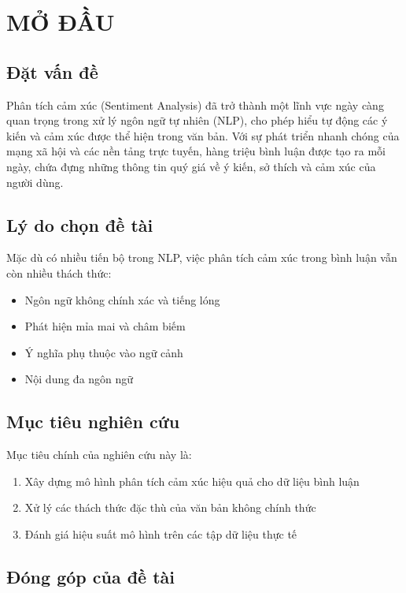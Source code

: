 \chapter{MỞ ĐẦU}

\section{Đặt vấn đề}

Phân tích cảm xúc (Sentiment Analysis) đã trở thành một lĩnh vực ngày càng quan trọng trong xử lý ngôn ngữ tự nhiên (NLP), cho phép hiểu tự động các ý kiến và cảm xúc được thể hiện trong văn bản. Với sự phát triển nhanh chóng của mạng xã hội và các nền tảng trực tuyến, hàng triệu bình luận được tạo ra mỗi ngày, chứa đựng những thông tin quý giá về ý kiến, sở thích và cảm xúc của người dùng.

\section{Lý do chọn đề tài}

Mặc dù có nhiều tiến bộ trong NLP, việc phân tích cảm xúc trong bình luận vẫn còn nhiều thách thức:
\begin{itemize}
    \item Ngôn ngữ không chính xác và tiếng lóng
    \item Phát hiện mỉa mai và châm biếm
    \item Ý nghĩa phụ thuộc vào ngữ cảnh
    \item Nội dung đa ngôn ngữ
\end{itemize}

\section{Mục tiêu nghiên cứu}

Mục tiêu chính của nghiên cứu này là:
\begin{enumerate}
    \item Xây dựng mô hình phân tích cảm xúc hiệu quả cho dữ liệu bình luận
    \item Xử lý các thách thức đặc thù của văn bản không chính thức
    \item Đánh giá hiệu suất mô hình trên các tập dữ liệu thực tế
\end{enumerate}

\section{Đóng góp của đề tài}

